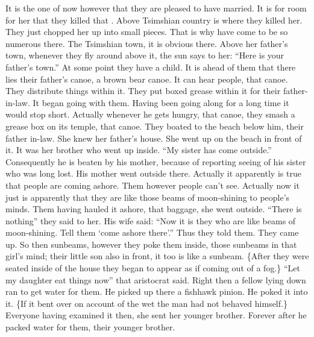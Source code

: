 \begin{pairs}
\begin{Rightside}
It is the one of now however that they are pleased to have married.
It is for room for her that they killed that .
Above Tsim\-shian country is where they killed her.
They just chopped her up into small pieces.
That is why  have come to be so numerous there.
The Tsimshian town, it is obvious there.
Above her father’s town, whenever they fly around above it, the sun says to her:
\qqk{}“Here is your father’s town.”
At some point they have a child.
It is ahead of them that there lies their father’s canoe, a brown bear canoe.
It can hear people, that canoe.
They distribute things within it.
They put boxed grease within it for their father-in-law.
It began going with them.
Having been going along for a long time it would stop short.
Actually whenever he gets hungry, that canoe, they smash a grease box on its temple, that canoe.
\pend
\pstart
{}They boated to the beach below him, their father in-law.
She knew her father’s house.
She went up on the beach in front of it.
It was her brother who went up inside.
\qqk{}“My sister has come outside.”
Consequently he is beaten by his mother, because of reporting seeing of his sister who was long lost.
His mother went outside there.
Actually it apparently is true that people are coming ashore.
Them however people can’t see.
Actually now it just is apparently that they are like those beams of moon-shining to people’s minds.
Them having hauled it ashore, that baggage, she went outside.
“There is nothing” they said to her.
His wife said:
\qqk{}“Now it is they who are like beams of moon-shining.
Tell them ‘come ashore there’.”
Thus they told them.
They came up.
\pend
\pstart
{}So then sunbeams, however they poke them inside, those sunbeams in that girl’s mind;
their little son also in front, it too is like a sunbeam.
\{After they were seated inside of the house they began to appear as if coming out of a fog.\}
\qqk{}“Let my daughter eat things now” that aristocrat said.
Right then a fellow lying down ran to get water for them.
He picked up there a fishhawk pinion.
He poked it into it.
\{If it bent over on account of the wet the man had not behaved himself.\}
Everyone having examined it then, she sent her younger brother.
Forever after he packed water for them, their younger brother.

\end{Rightside}
\end{pairs}

